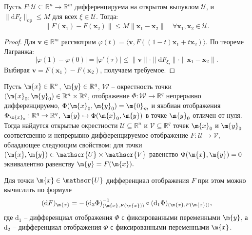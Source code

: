 \begin{theorem}
Пусть $F: \mathscr{U} \subseteq \mathbb{R}^n \to \mathbb{R}^m$ дифференцируема на открытом выпуклом $\mathscr{U}$, и $\|\mathrm{d}F_{\xi}\|_{\mathrm{op}} \leq M$ для всех $\xi \in \mathscr{U}$. Тогда:
\[
\|F(\mathbf{x}_1) - F(\mathbf{x}_2)\| \leq M \|\mathbf{x}_1 - \mathbf{x}_2\| \quad \forall \mathbf{x}_1, \mathbf{x}_2 \in \mathscr{U}.
\]
\end{theorem}
\begin{proof}
Для $\mathbf{v} \in \mathbb{R}^m$ рассмотрим $\varphi(t) = \langle \mathbf{v}, F((1-t)\mathbf{x}_1 + t \mathbf{x}_2) \rangle$. По теореме Лагранжа:
\[
|\varphi(1) - \varphi(0)| = |\varphi'(\tau)| \leq \|\mathbf{v}\| \cdot \|\mathrm{d}F_{\xi_\tau}\| \cdot \|\mathbf{x}_1 - \mathbf{x}_2\|.
\]
Выбирая $\mathbf{v} = F(\mathbf{x}_1) - F(\mathbf{x}_2)$, получаем требуемое.
\end{proof}






\begin{theorem}\label{implicit_theorem}
    Пусть $\m{x} \in \mathbb{R}^n$, $\m{y} \in \mathbb{R}^q$, $\mathscr{W}$ -- окрестность точки $(\m{x}_0, \m{y}_0) \in \mathbb{R}^n \times \mathbb{R}^q$, отображение $\Phi: \mathscr{W} \to \mathbb{R}^q$ непрерывно дифференцируемо, $\Phi(\m{x}_0, \m{y}_0) = \m{0}_m$ и якобиан отображения  $\Phi_{\m{x}_0}: \mathbb{R}^q \to \mathbb{R}^q$, $\m{y}\mapsto \Phi(\m{x}_0, \m{y})$ в точке $\m{y}_0$ отличен от нуля. Тогда найдутся открытые окрестности $\mathscr{U} \subseteq \mathbb{R}^n$ и $\mathscr{V} \subseteq \mathbb{R}^q$ точек $\m{x}_0$ и $\m{y}_0$ соответсвенно и непрерывно дифференцируемое отображение $F: \mathscr{U} \to \mathscr{V}$, обладающее следующим свойством: для точки $(\m{x}, \m{y}) \in \mathscr{U} \times \mathscr{V}$ равенство $\Phi(\m{x}, \m{y}) = 0$ эквивалентно равенству $\m{y} = F(\m{x}).$

    Для точки $\m{x} \in \mathscr{U}$ дифференциал отображения $F$ при этом можно вычислить по формуле
    \[
     (\mathrm{d}F)_\m{x} = - \left( \mathrm{d}_2 \Phi \right)^{-1}_{(\m{x}, F(\m{x}))} \circ (\mathrm{d}_1 \Phi)_{(\m{x}, F(\m{x}))},
    \]
    где $\mathrm{d}_1$ -- дифференциал отображения $\Phi$ с фиксированными переменными $\m{y}$, а $\mathrm{d}_2$ -- дифференциал отображения $\Phi$ с фиксированными переменными $\m{x}$.
\end{theorem}

